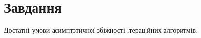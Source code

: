 
\chapter{Завдання \theHchapter}

\begin{tcolorbox}[title=Завдання 13]
    Достатні умови асимптотичної збіжності ітераційних алгоритмів.
\end{tcolorbox}

